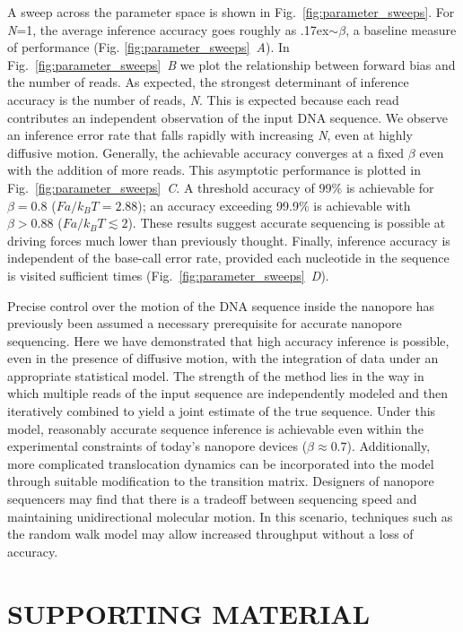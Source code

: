 \documentclass{biophys_letter}
\newcommand{\bias}{\beta}
\newcommand{\kje}[1]{\textcolor{BurntOrange}{#1}}
\begin{document}
A sweep across the parameter space is shown in Fig.~\ref{fig:parameter_sweeps}.
For \emph{N}=1, the average inference accuracy goes roughly as {\raise.17ex\hbox{$\scriptstyle\sim$}}$\bias$, a baseline measure of performance (Fig. \ref{fig:parameter_sweeps}\emph{~A}).
In Fig.~\ref{fig:parameter_sweeps}\emph{~B} we plot the relationship between forward bias and the number of reads.
As expected, the strongest determinant of inference accuracy is the number of reads, \emph{N}.
This is expected because each read contributes an independent observation of the input DNA sequence.
We observe an inference error rate that falls rapidly with increasing \emph{N}, even at highly diffusive motion. 
Generally, the achievable accuracy converges at a fixed $\bias$ even with the addition of more reads.
This asymptotic performance is plotted in Fig.~\ref{fig:parameter_sweeps}\emph{~C}.
A threshold accuracy of 99\% is achievable for $\bias=0.8$ \kje{($Fa/k_{B}T=2.88$)}; an accuracy exceeding 99.9\% is achievable with $\bias>0.88$ \kje{($Fa/k_{B}T\lesssim2$)}.
\kje{These results suggest accurate sequencing is possible at driving forces much lower than previously thought.}
Finally, inference accuracy is independent of the base-call error rate, provided each nucleotide in the sequence is visited sufficient times (Fig.~\ref{fig:parameter_sweeps}\emph{~D}).

Precise control over the motion of the DNA sequence inside the nanopore has previously been assumed a necessary prerequisite for accurate nanopore sequencing.
Here we have demonstrated that high accuracy inference is possible, even in the presence of diffusive motion, with the integration of data under an appropriate statistical model. 
The strength of the method lies in the way in which multiple reads of the input sequence are independently modeled and then iteratively combined to yield a joint estimate of the true sequence.
Under this model, reasonably accurate sequence inference is achievable even within the experimental constraints of today's nanopore devices ($\bias\approx 0.7$).
\kje{Additionally, more complicated translocation dynamics can be incorporated into the model through suitable modification to the transition matrix.}
Designers of nanopore sequencers may find that there is a tradeoff between sequencing speed and maintaining unidirectional molecular motion.
In this scenario, techniques such as the random walk model may allow increased throughput without a loss of accuracy.

\section*{SUPPORTING MATERIAL}
\end{document}
